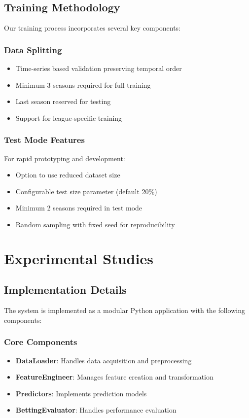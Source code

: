 \documentclass[conference]{IEEEtran}
\begin{document}
\subsection{Training Methodology}
Our training process incorporates several key components:

\subsubsection{Data Splitting}
\begin{itemize}
\item Time-series based validation preserving temporal order
\item Minimum 3 seasons required for full training
\item Last season reserved for testing
\item Support for league-specific training
\end{itemize}

\subsubsection{Test Mode Features}
For rapid prototyping and development:
\begin{itemize}
\item Option to use reduced dataset size
\item Configurable test size parameter (default 20\%)
\item Minimum 2 seasons required in test mode
\item Random sampling with fixed seed for reproducibility
\end{itemize}

\section{Experimental Studies}
\subsection{Implementation Details}
The system is implemented as a modular Python application with the following components:

\subsubsection{Core Components}
\begin{itemize}
\item \textbf{DataLoader}: Handles data acquisition and preprocessing
\item \textbf{FeatureEngineer}: Manages feature creation and transformation
\item \textbf{Predictors}: Implements prediction models
\item \textbf{BettingEvaluator}: Handles performance evaluation
\end{itemize}
\end{document}
